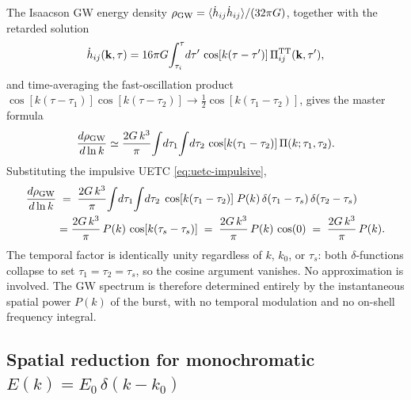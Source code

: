 \documentclass[10pt,prd,aps,nobibnotes,superscriptaddress,preprintnumbers,notitlepage]{revtex4-1}
\newcommand{\kb}{{\bf k}}
\begin{document}
The Isaacson GW energy density $\rho_{\rm GW}=\langle\dot h_{ij}\dot
h_{ij}\rangle/(32\pi G)$, together with the retarded solution
\begin{equation}
  \dot h_{ij}(\kb,\tau) = 16\pi G\!\int_{\tau_i}^{\tau}\!d\tau'\,
  \cos[k(\tau-\tau')]\,\Pi^{\rm TT}_{ij}(\kb,\tau'),
  \label{eq:impulsive-hdot}
\end{equation}
and time-averaging the fast-oscillation product
$\cos[k(\tau-\tau_1)]\cos[k(\tau-\tau_2)]\to\tfrac{1}{2}\cos[k(\tau_1-\tau_2)]$,
gives the master formula
\begin{equation}
  \frac{d\rho_{\rm GW}}{d\ln k}
  \simeq \frac{2G\,k^3}{\pi}
  \!\int\!d\tau_1\!\int\!d\tau_2\,
  \cos[k(\tau_1-\tau_2)]\,\Pi(k;\tau_1,\tau_2).
  \label{eq:master-impulsive}
\end{equation}
Substituting the impulsive UETC \eqref{eq:uetc-impulsive},
\begin{align}
  \frac{d\rho_{\rm GW}}{d\ln k}
  &\;=\; \frac{2G\,k^3}{\pi}
    \!\int\!d\tau_1\!\int\!d\tau_2\;
    \cos[k(\tau_1-\tau_2)]\;
    P(k)\,\delta(\tau_1-\tau_s)\,\delta(\tau_2-\tau_s)
    \nonumber\\
  &= \frac{2G\,k^3}{\pi}\,P(k)\,\cos[k(\tau_s-\tau_s)]
  \;=\; \frac{2G\,k^3}{\pi}\,P(k)\,\cos(0)
  \;=\; \frac{2G\,k^3}{\pi}\,P(k).
  \label{eq:impulsive-temporal}
\end{align}
The temporal factor is identically unity regardless of $k$, $k_0$, or $\tau_s$:
both $\delta$-functions collapse to set $\tau_1=\tau_2=\tau_s$, so the cosine
argument vanishes. No approximation is involved. The GW spectrum is therefore
determined entirely by the instantaneous spatial power $P(k)$ of the burst,
with no temporal modulation and no on-shell frequency integral.

\subsection{Spatial reduction for monochromatic $E(k)=E_0\,\delta(k-k_0)$}
\label{sec:impulsive-spatial}
\end{document}
